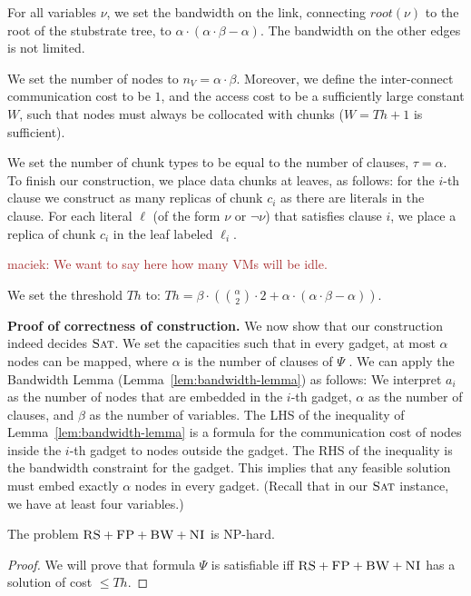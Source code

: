 \documentclass[9pt]{sigcomm-alternate}
\newcommand{\maciek}[1]{\textcolor{brown}{maciek: #1}}
\newcommand{\variab}{\nu}
\newcommand{\clauses}{\alpha}
\newcommand{\variables}{\beta}
\newcommand{\achunk}{\ensuremath{c}}
\newcommand{\CC}{\textsc{NI}}
\newcommand{\FP}{\textsc{FP}}
\newcommand{\RS}{\textsc{RS}}
\newcommand{\BW}{\textsc{BW}}
\newcommand{\Vms}{\ensuremath{n_V}}
\newcommand{\SAT}{\textsc{Sat}}
\newcommand{\Formula}{\ensuremath{\Psi}}
\newcommand{\Thr}{\ensuremath{Th}}
\begin{document}
\begin{appendix}
For all variables $\nu$, we set the bandwidth
on the link, connecting $root(\nu)$ to the root of
the stubstrate tree, to $\clauses \cdot (\clauses
\cdot \variables -
\clauses)$. The bandwidth on the other
edges is not limited.


We set the number of nodes to $\Vms = \clauses \cdot \variables$.
Moreover, we define the inter-connect communication cost to be $1$,
and the access cost to be a sufficiently large constant $W$,
such that nodes must always be collocated with chunks ($W = \Thr + 1$ is
sufficient).


We set the number of chunk types to be equal to the number of clauses, $\tau =
\clauses$. To finish our construction, we place data chunks at
leaves, as follows: for the $i$-th clause we
construct as many replicas of chunk $\achunk_i$ as there are literals in the
clause. For each literal $\ell$ (of the form $\variab$ or $\neg \variab$) that satisfies clause $i$,
 we place
a replica of chunk $\achunk_i$ in the leaf labeled $\ell_i$.

\maciek{We want to say here how many VMs will be idle.}

We set the threshold $\Thr$ to:
$ \Thr = \variables \cdot ({\clauses  \choose 2} \cdot 2 +
\clauses \cdot (\clauses
\cdot \variables - \clauses))$.

\textbf{Proof of correctness of construction.}
We now show that our construction indeed
decides $\SAT$. We set the capacities such that in every gadget,
at most $\clauses$ nodes can be mapped, where $\clauses$
is the number of clauses of $\Formula$
.
We can apply the Bandwidth Lemma (Lemma~\ref{lem:bandwidth-lemma}) as follows:
We interpret $a_i$ as the
number of nodes that are embedded in the $i$-th gadget, $\clauses$
as the number
of clauses, and $\variables$ as the number of variables.
The LHS of the inequality of Lemma~\ref{lem:bandwidth-lemma}
is a formula for the communication cost of nodes inside the $i$-th
gadget to nodes outside the gadget. The RHS of the inequality is the
bandwidth constraint for the gadget. This implies that
any feasible solution must embed exactly $\clauses$ nodes in every gadget.
(Recall that in our $\SAT$ instance, we have at least four variables.)

\begin{theorem}
The problem $\RS+\FP+\BW+\CC$ is NP-hard.
\label{theorem:3sat}
\end{theorem}
\begin{proof}
We will prove that formula $\Formula$ is satisfiable iff $\RS+\FP+\BW+\CC$ has
a solution of cost $\leq \Thr$.


\end{proof}
\end{appendix}
\end{document}
